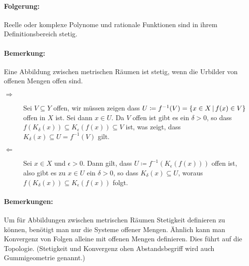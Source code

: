\paragraph{Folgerung:}
Reelle oder komplexe Polynome und rationale Funktionen sind in ihrem Definitionsbereich stetig.
\paragraph{Bemerkung:}
Eine Abbildung zwischen metrischen Räumen ist stetig, wenn die Urbilder von offenen Mengen offen sind.
\beweis
\begin{description}
	\item[\glqq$\Rightarrow$\grqq] Sei $V\subseteq Y$ offen, wir müssen zeigen dass
	$U\coloneqq f^{-1}(V) =\left\{ x\in X \,\middle|\, f(x)\in V \right\}$ offen in $X$ ist.
	Sei dann $x\in U$. Da $V$ offen ist gibt es ein $\delta>0$, so dass $f(K_\delta(x))\subseteq K_\epsilon(f(x))\subseteq V$ ist, was zeigt, dass $K_\delta(x)\subseteq U = f^{-1}(V)$ gilt.

	\item[\glqq$\Leftarrow$\grqq] Sei $x\in X$ und $\epsilon>0$. Dann gilt, dass $U\coloneqq f^{-1}(K_\epsilon(f(x)))$ offen ist, also gibt es zu $x\in U$ ein $\delta>0$, so dass $K_\delta(x)\subseteq U$, woraus $f(K_\delta(x))\subseteq K_\epsilon(f(x))$ folgt.
\end{description}
\paragraph{Bemerkungen:}
Um für Abbildungen zwischen metrischen Räumen Stetigkeit definieren zu können, benötigt man nur die Systeme offener Mengen. Ähnlich kann man Konvergenz von Folgen alleine mit offenen Mengen definieren. Dies führt auf die Topologie. (Stetigkeit und Konvergenz ohen Abstandsbegriff wird auch Gummigeometrie genannt.)
